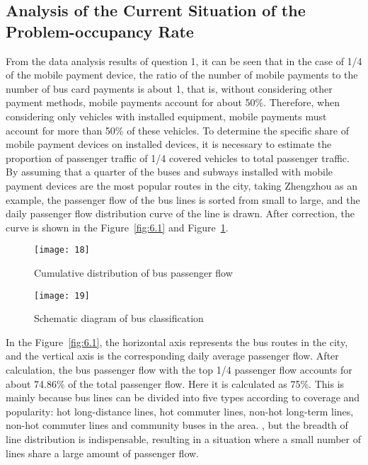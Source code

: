 \documentclass[../mcmpaper]{subfiles}
\begin{document}
\subsection{Analysis of the Current Situation of the Problem-occupancy Rate}
From the data analysis results of question 1, it can be seen that in the case of 1/4 of the mobile payment device, the ratio of the number of mobile payments to the number of bus card payments is about 1, that is, without considering other payment methods, mobile payments account for about 50\%. Therefore, when considering only vehicles with installed equipment, mobile payments must account for more than 50\% of these vehicles. To determine the specific share of mobile payment devices on installed devices, it is necessary to estimate the proportion of passenger traffic of 1/4 covered vehicles to total passenger traffic. By assuming that a quarter of the buses and subways installed with mobile payment devices are the most popular routes in the city, taking Zhengzhou as an example, the passenger flow of the bus lines is sorted from small to large, and the daily passenger flow distribution curve of the line is drawn. After correction, the curve is shown in the Figure~\ref{fig:6.1} and Figure~\ref{fig:6.2}.
\begin{figure}[!ht]
\centering
\begin{minipage}[c]{0.48\linewidth}
    \centering
    \texttt{[image: 18]}
    \caption{Cumulative distribution of bus passenger flow}
    \label{fig:6.1}
\end{minipage}
\quad
\begin{minipage}[c]{0.48\linewidth}
    \centering
    \texttt{[image: 19]}
    \caption{Schematic diagram of bus classification}
     \label{fig:6.2}
\end{minipage}
\end{figure}
\par
In the Figure~\ref{fig:6.1}, the horizontal axis represents the bus routes in the city, and the vertical axis is the corresponding daily average passenger flow. After calculation, the bus passenger flow with the top 1/4 passenger flow accounts for about 74.86\% of the total passenger flow. Here it is calculated as 75\%. This is mainly because bus lines can be divided into five types according to coverage and popularity: hot long-distance lines, hot commuter lines, non-hot long-term lines, non-hot commuter lines and community buses in the area. , but the breadth of line distribution is indispensable, resulting in a situation where a small number of lines share a large amount of passenger flow.
\end{document}

